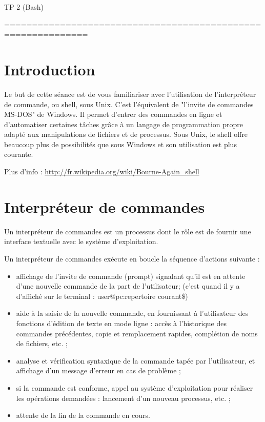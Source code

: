 \documentclass[10pt,a4paper]{article}
\begin{document}
\begin{center}
\huge{TP 2 (Bash)}
\end{center}
=============================================================


\section{Introduction}

Le but de cette séance est de vous familiariser avec l’utilisation de l’interpréteur de commande, ou shell, sous Unix. C’est l’équivalent de "l'invite de commandes MS-DOS" de Windows. Il permet d’entrer des commandes en ligne et d’automatiser certaines tâches grâce à un langage de programmation propre adapté aux manipulations de fichiers et de processus. Sous Unix, le shell offre beaucoup plus de possibilités que sous Windows et son utilisation est plus courante.

Plus d'info : \url{http://fr.wikipedia.org/wiki/Bourne-Again\_shell}

\section{Interpréteur de commandes}

Un interpréteur de commandes est un processus dont le rôle est de fournir une interface textuelle avec le système d'exploitation.

Un interpréteur de commandes exécute en boucle la séquence d'actions suivante :
\begin{itemize}
\item affichage de l'invite de commande (prompt) signalant qu'il est en attente d'une nouvelle commande de la part de l'utilisateur; (c'est quand il y a d'affiché sur le terminal : user@pc:repertoire courant\$)
\item aide à la saisie de la nouvelle commande, en fournissant à l'utilisateur des fonctions d'édition de texte en mode ligne : accès à l'historique des commandes précédentes, copie et remplacement rapides, complétion de noms de fichiers, etc. ;
\item analyse et vérification syntaxique de la commande tapée par l'utilisateur, et affichage d'un message d'erreur en cas de problème ;
\item si la commande est conforme, appel au système d'exploitation pour réaliser les opérations demandées : lancement d'un nouveau processus, etc. ;
\item attente de la fin de la commande en cours.
\end{itemize}
\end{document}
